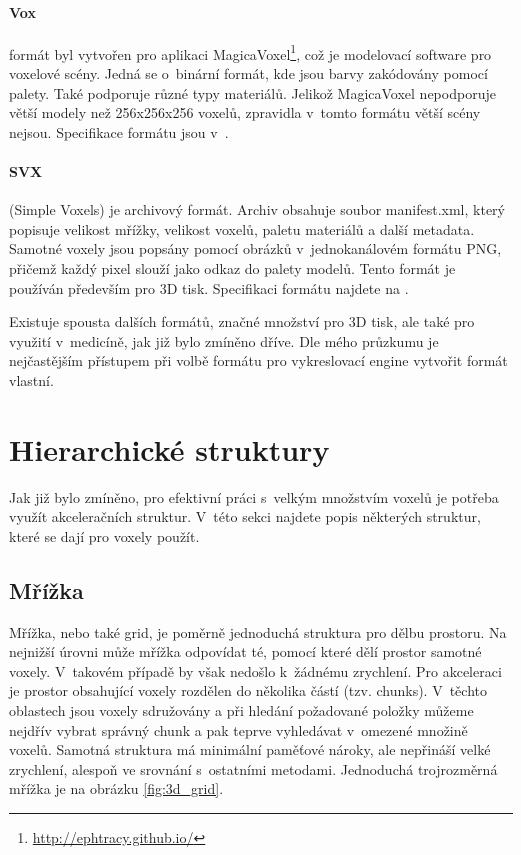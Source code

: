 \paragraph{Vox} formát byl vytvořen pro aplikaci MagicaVoxel\footnote{\url{http://ephtracy.github.io/}}, což je modelovací software pro voxelové scény. Jedná se o~binární formát, kde jsou barvy zakódovány pomocí palety. Také podporuje různé typy materiálů. Jelikož MagicaVoxel nepodporuje větší modely než 256x256x256 voxelů, zpravidla v~tomto formátu větší scény nejsou. Specifikace formátu jsou v~\cite{vox_format}.

\paragraph{SVX} (Simple Voxels) je archivový formát. Archiv obsahuje soubor manifest.xml, který popisuje velikost mřížky, velikost voxelů, paletu materiálů a další metadata. Samotné voxely jsou popsány pomocí obrázků v~jednokanálovém formátu PNG, přičemž každý pixel slouží jako odkaz do palety modelů. Tento formát je používán především pro 3D tisk. Specifikaci formátu najdete na \cite{svx_format_2014}.

Existuje spousta dalších formátů, značné množství pro 3D tisk, ale také pro využití v~medicíně, jak již bylo zmíněno dříve. Dle mého průzkumu je nejčastějším přístupem při volbě formátu pro vykreslovací engine vytvořit formát vlastní.


\section{Hierarchické struktury}
Jak již bylo zmíněno, pro efektivní práci s~velkým množstvím voxelů je potřeba využít akceleračních struktur. V~této sekci najdete popis některých struktur, které se dají pro voxely použít.

\subsection{Mřížka}
Mřížka, nebo také grid, je poměrně jednoduchá struktura pro dělbu prostoru. Na nejnižší úrovni může mřížka odpovídat té, pomocí které dělí prostor samotné voxely. V~takovém případě by však nedošlo k~žádnému zrychlení. Pro akceleraci je prostor obsahující voxely rozdělen do několika částí (tzv. chunks). V~těchto oblastech jsou voxely sdružovány a při hledání požadované položky můžeme nejdřív vybrat správný chunk a pak teprve vyhledávat v~omezené množině voxelů. Samotná struktura má minimální paměťové nároky, ale nepřináší velké zrychlení, alespoň ve srovnání s~ostatními metodami. Jednoduchá trojrozměrná mřížka je na obrázku \ref{fig:3d_grid}.

